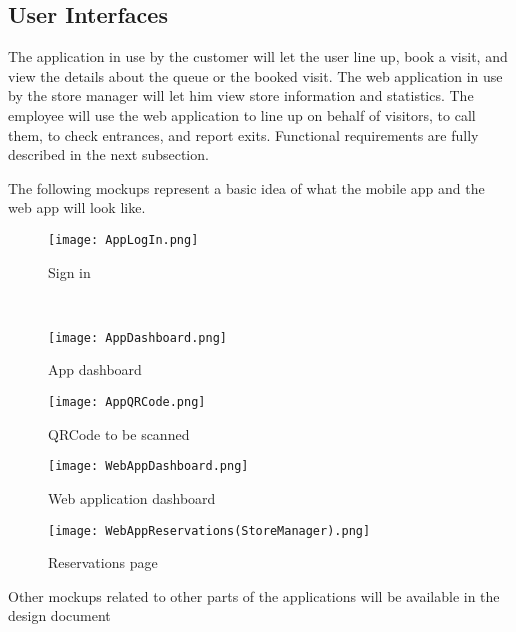 \subsection{User Interfaces}
The application in use by the customer will let the user line up, book a visit, and view the details about the queue or the booked visit.
The web application in use by the store manager will let him view store information and statistics. The employee will use the web application to line up on behalf of visitors, to call them, to check entrances, and report exits. Functional requirements are fully described in the next subsection. 

The following mockups represent a basic idea of what the mobile app and the web app will look like.

\begin{figure}[H]
    \begin{minipage}[b]{8cm}
    \centering
    \texttt{[image: AppLogIn.png]}
    \caption{Sign in}
    \end{minipage}
    \ \hspace{2mm} \hspace{3mm} \
    \begin{minipage}[b]{8cm}
    \centering
    \texttt{[image: AppDashboard.png]}
    \caption{App dashboard}
    \end{minipage}
\end{figure}

\begin{figure}[H]
    \centering
    \texttt{[image: AppQRCode.png]}
    \caption{QRCode to be scanned}
\end{figure}

\begin{figure}[H]
    \centering
    \texttt{[image: WebAppDashboard.png]}
    \caption{Web application dashboard}
\end{figure}

\begin{figure}[H]
    \centering
    \texttt{[image: WebAppReservations(StoreManager).png]}
    \caption{Reservations page}
\end{figure}
Other mockups related to other parts of the applications will be available in the design document

